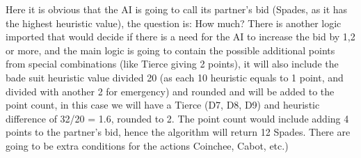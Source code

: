 Here it is obvious that the AI
is going to call its partner’s bid (Spades, as it has the highest heuristic value), the question is: How much? There is another logic
imported that would decide if there is a need for the AI to increase the bid by 1,2 or
more, and the main logic is going to contain the possible additional points from special
combinations (like Tierce giving 2 points), it will also include the bade suit heuristic
value divided 20 (as each 10 heuristic equals to 1 point, and divided with another 2 for emergency)
and rounded and will be added to the point
count, in this case we will have a Tierce (D7, D8, D9) and heuristic difference of 32/20
= 1.6, rounded to 2. The point count would include adding 4 points to the partner’s bid,
hence the algorithm will return 12 Spades. There are going to be extra conditions for
the actions Coinchee, Cabot, etc.)



